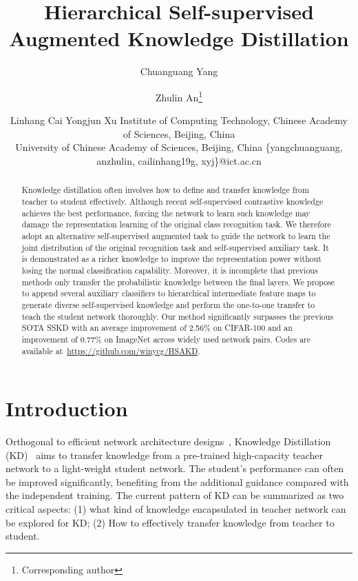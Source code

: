 \documentclass{article}
\title{Hierarchical Self-supervised Augmented Knowledge Distillation}
\author{
Chuanguang Yang
\and
Zhulin An\thanks{Corresponding author} \and
Linhang Cai\And
Yongjun Xu
\affiliations
Institute of Computing Technology, Chinese Academy of Sciences, Beijing, China\\
University of Chinese Academy of Sciences, Beijing, China
\emails
\{yangchuanguang, anzhulin, cailinhang19g, xyj\}@ict.ac.cn
}
\begin{document}
\maketitle

\begin{abstract}
  Knowledge distillation often involves how to define and transfer knowledge from teacher to student effectively. Although recent self-supervised contrastive knowledge achieves the best performance, forcing the network to learn such knowledge may damage the representation learning of the original class recognition task. We therefore adopt an alternative self-supervised augmented task to guide the network to learn the joint distribution of the original recognition task and self-supervised auxiliary task. It is demonstrated as a richer knowledge to improve the representation power without losing the normal classification capability. Moreover, it is incomplete that previous methods only transfer the probabilistic knowledge between the final layers. We propose to append several auxiliary classifiers to hierarchical intermediate feature maps to generate diverse self-supervised knowledge and perform the one-to-one transfer to teach the student network thoroughly. Our method significantly surpasses the previous SOTA SSKD with an average improvement of 2.56\% on CIFAR-100 and an improvement of 0.77\% on ImageNet across widely used network pairs. Codes are available at~\url{https://github.com/winycg/HSAKD}.
\end{abstract}

\section{Introduction}
Orthogonal to efficient network architecture designs~\cite{yang2019multi,zhu2019eena,yang2020gated}, Knowledge Distillation (KD)~\cite{hinton2015distilling} aims to transfer knowledge from a pre-trained high-capacity teacher network to a light-weight student network. The student's performance can often be improved significantly, benefiting from the additional guidance compared with the independent training. The current pattern of KD can be summarized as two critical aspects: (1) what kind of knowledge encapsulated in teacher network can be explored for KD; (2) How to effectively transfer knowledge from teacher to student.
\end{document}
